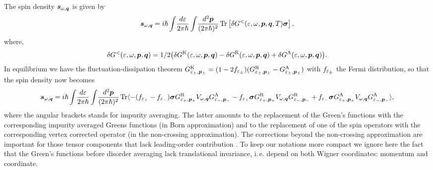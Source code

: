 The spin density $\boldsymbol{s}_{\omega,\boldsymbol{q}}$ is given by
\begin{equation}
    \boldsymbol{s}_{\omega,\boldsymbol{q}} = {i\hslash} \int\!\frac{d\varepsilon}{2\pi\hslash}\int\!\frac{d^2\boldsymbol{p}}{(2\pi\hslash)^2}\operatorname{Tr} \left[\delta G^<({\varepsilon,\omega,\boldsymbol{p},\boldsymbol{q}},T) \boldsymbol{\sigma}\right],
\end{equation}
where,
\begin{multline}
    \delta G^<(\varepsilon,\omega,\boldsymbol{p},\boldsymbol{q}) = 1/2 \big(\delta G^\text{K}(\varepsilon,\omega,\boldsymbol{p},\boldsymbol{q})-
    \delta G^\text{R}(\varepsilon,\omega,\boldsymbol{p},\boldsymbol{q})+\delta G^\text{A}(\varepsilon,\omega,\boldsymbol{p},\boldsymbol{q})\big).  
\end{multline}
In equilibrium we have the fluctuation-dissipation theorem $   G^\text{K}_{\varepsilon_\pm,\boldsymbol{p}_\pm} = (1-2f_{\varepsilon_\pm})(G^\text{R}_{\varepsilon_\pm,\boldsymbol{p}_\pm}-G^\text{A}_{\varepsilon_\pm,\boldsymbol{p}_\pm}) $ with $f_{\varepsilon_\pm}$ the Fermi distribution, so that the spin density now becomes
\begin{align}
    \boldsymbol{s}_{\omega,\boldsymbol{q}} = {i\hslash} \int\!\frac{d\varepsilon}{2\pi\hslash}\int\!\frac{d^2\boldsymbol{p}}{(2\pi\hslash)^2}\operatorname{Tr}\langle\nonumber
     -(f_{\varepsilon_+}-f_{\varepsilon_-})\boldsymbol{\sigma}G^\text{R}_{\varepsilon_+,\boldsymbol{p}_+} V_{\omega,\boldsymbol{q}}G^\text{A}_{\varepsilon_-,\boldsymbol{p}_-}\nonumber
    -f_{\varepsilon_+}\boldsymbol{\sigma}G^\text{R}_{\varepsilon_+,\boldsymbol{p}_+} V_{\omega,\boldsymbol{q}}G^\text{R}_{\varepsilon_-,\boldsymbol{p}_-}\nonumber
    +f_{\varepsilon_-}\boldsymbol{\sigma}G^\text{A}_{\varepsilon_+,\boldsymbol{p}_+} V_{\omega,\boldsymbol{q}}G^\text{A}_{\varepsilon_-,\boldsymbol{p}_-}\rangle,
\end{align}
where the angular brackets stands for impurity averaging. The latter amounts to the replacement of the Green's functions with the corresponding impurity averaged Greens functions (in Born approximation) and to the replacement of one of the spin operators with the corresponding vertex corrected operator (in the non-crossing approximation). The corrections beyond the non-crossing approximation are important for those tensor components that lack leading-order contribution \cite{ivan}. To keep our notations more compact we ignore here the fact that the Green's functions before disorder averaging lack translational invariance, i.\,e. depend on both Wigner coordinates: momentum and coordinate. 


